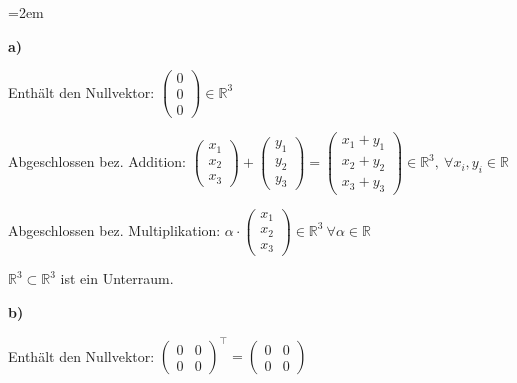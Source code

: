 \vspace{1\baselineskip}

\begin{solution}    

    \vspace{1\baselineskip}

    \leftskip=2em

    \textbf{a)} 

    Enthält den Nullvektor: \( \begin{pmatrix} 0 \\ 0 \\ 0 \end{pmatrix} \in \mathbb{R}^3 \)

    \vspace{0.5\baselineskip}

    Abgeschlossen bez. Addition: \( \begin{pmatrix} x_1 \\ x_2 \\ x_3 \end{pmatrix} + \begin{pmatrix} y_1 \\ y_2 \\ y_3 \end{pmatrix} = \begin{pmatrix} x_1 + y_1 \\ x_2 + y_2 \\ x_3 + y_3 \end{pmatrix} \in \mathbb{R}^3, \ \forall x_i, y_i \in \mathbb{R} \)

    \vspace{0.5\baselineskip}

    Abgeschlossen bez. Multiplikation: \( \alpha \cdot \begin{pmatrix}
        x_1 \\ x_2 \\ x_3
    \end{pmatrix} \in \mathbb{R}^3 \ \forall \alpha \in \mathbb{R} \)

    \( \mathbb{R}^3 \subset \mathbb{R}^3 \) ist ein Unterraum.

    \vspace{4\baselineskip}

    \textbf{b)} 

    Enthält den Nullvektor: \( \begin{pmatrix}
        0 & 0 \\
        0 & 0
    \end{pmatrix}^\top = \begin{pmatrix}
        0 & 0 \\
        0 & 0
    \end{pmatrix} \)


\end{solution}
